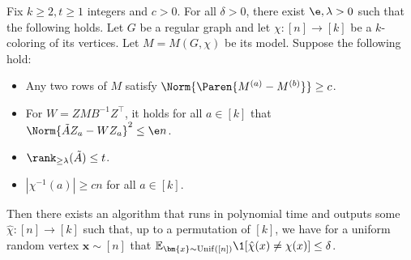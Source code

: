 \begin{theorem}
    Fix $k \geq 2, t \geq 1$ integers and $c > 0$.
    For all $\delta > 0$, there exist $\e, \lambda > 0$ such that the following holds.
    Let $G$ be a regular graph and let $\chi: [n] \to [k]$ be a $k$-coloring of its vertices.
    Let $M = M(G, \chi)$ be its model.
    Suppose the following hold:
    \begin{itemize}
        \item Any two rows of $M$ satisfy $\Norm{\Paren{M^{(a)} - M^{(b)}}} \geq c$.
        \item For $W = Z M B^{-1} Z^\top$, it holds for all $a \in [k]$ that  $\Norm{\tilde{A} Z_a - W  Z_a}^2 \leq \e n$.
        \item $\rank_{\geq \lambda}(\tilde{A}) \leq t$.
        \item $|\chi^{-1}(a)| \geq c n$ for all $a \in [k]$.
    \end{itemize}
    Then there exists an algorithm that runs in polynomial time and outputs some $\hat{\chi}: [n] \to [k]$ such that, up to a permutation of $[k]$, we have for a uniform random vertex $\bm{x} \sim [n]$ that $\mathbb{E}_{\bm{x} \sim \operatorname{Unif}([n])} \1[\hat\chi(x) \neq \chi(x)] \leq \delta$.
\end{theorem}

